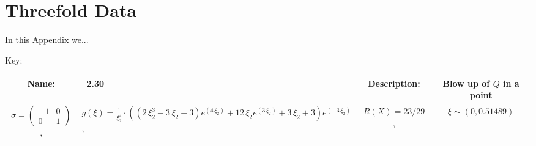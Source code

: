 \chapter{Threefold Data}
\label{appendix1}
\renewcommand{\thefootnote}{\fnsymbol{footnote}} 
\setcounter{footnote}{0}
In this Appendix we...

Key:

{\setlength{\parindent}{0pt}
\newpage
\begin{landscape}
%
%
%
%
%
%
%
%
%
%
%
%
%
\begin{tabularx}{\linewidth}{clcc}
\toprule
\midrule
\textbf{Name:} & \ 2.30 \hspace{0.3\linewidth} & \textbf{Description:} & Blow up of $Q$ in a point\\
\midrule
{\small $ \sigma = \begin{pmatrix} -1 & 0 \\ 0 & 1 \end{pmatrix}$ }, & \( g(\xi) = \frac{1}{\xi_{2}^{4}}\cdot\left({\left(2 \, \xi_{2}^{3} - 3 \, \xi_{2} - 3\right)} e^{\left(4 \, \xi_{2}\right)} + 12 \, \xi_{2} e^{\left(3 \, \xi_{2}\right)} + 3 \, \xi_{2} + 3\right) e^{\left(-3 \, \xi_{2}\right)} \), & $ R(X) = 23/29$ , & $\xi \sim (0,0.51489)$
\end{tabularx}
\begin{figure}[H]
\centering


\end{figure}
\end{landscape}}
